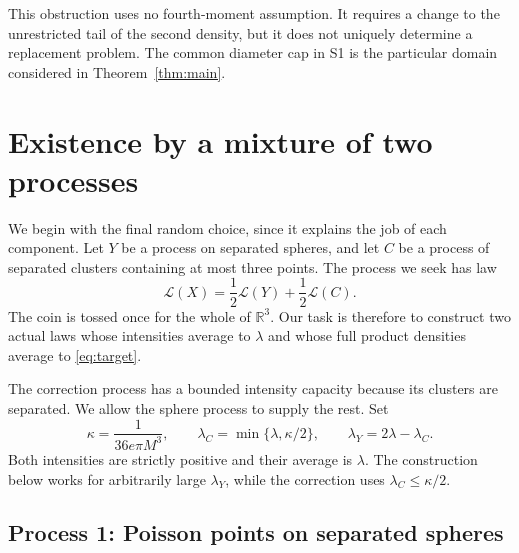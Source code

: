\documentclass[11pt,a4paper]{article}
\numberwithin{equation}{section}
\theoremstyle{definition}
\theoremstyle{remark}
\newcommand{\R}{\mathbb R}
\newcommand{\Law}{\mathcal L}
\begin{document}
This obstruction uses no fourth-moment assumption. It requires a change
to the unrestricted tail of the second density, but it does not uniquely
determine a replacement problem. The common diameter cap in S1 is the
particular domain considered in Theorem~\ref{thm:main}.

\section{Existence by a mixture of two processes}
\label{sec:construction}

We begin with the final random choice, since it explains the job of each
component. Let $Y$ be a process on separated spheres, and let $C$ be a
process of separated clusters containing at most three points. The process
we seek has law
\begin{equation}
 \Law(X)=\frac12\Law(Y)+\frac12\Law(C).
 \label{eq:fair-coin}
\end{equation}
The coin is tossed once for the whole of $\R^3$. Our task is therefore to
construct two actual laws whose intensities average to $\lambda$ and whose
full product densities average to \eqref{eq:target}.

The correction process has a bounded intensity capacity because its
clusters are separated. We allow the sphere process to supply the rest.
Set
\begin{equation}
 \kappa=\frac1{36e\pi M^3},\qquad
 \lambda_C=\min\{\lambda,\kappa/2\},\qquad
 \lambda_Y=2\lambda-\lambda_C.
 \label{eq:component-intensities}
\end{equation}
Both intensities are strictly positive and their average is $\lambda$.
The construction below works for arbitrarily large $\lambda_Y$, while the
correction uses $\lambda_C\leq\kappa/2$.

\subsection{Process 1: Poisson points on separated spheres}
\label{subsec:spheres}
\end{document}
